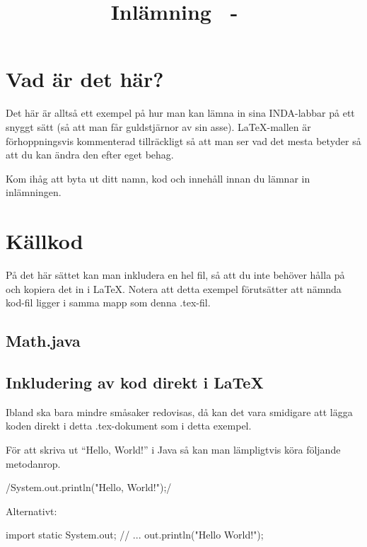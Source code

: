 \documentclass[a4paper,10pt,english,swedish]{article}
\title{Inlämning \assignmentnr\ - \course\ \coursename}
\date{\thedate}
\author{\theauthor}
\begin{document}


\setcounter{page}{1}

\section{Vad är det här?}

Det här är alltså ett exempel på hur man kan lämna in sina INDA-labbar
på ett snyggt sätt (så att man får guldstjärnor av sin
asse). \LaTeX-mallen är förhoppningsvis kommenterad tillräckligt så
att man ser vad det mesta betyder så att du kan ändra den efter eget
behag.

Kom ihåg att byta ut ditt namn, kod och innehåll innan du lämnar in
inlämningen.

\section{Källkod}

På det här sättet kan man inkludera en hel fil, så att du inte behöver
hålla på och kopiera det in i \LaTeX. Notera att detta exempel
förutsätter att nämnda kod-fil ligger i samma mapp som denna
.tex-fil.

\subsection{Math.java}

\subsection{Inkludering av kod direkt i \LaTeX}

Ibland ska bara mindre småsaker redovisas, då kan det vara smidigare
att lägga koden direkt i detta .tex-dokument som i detta exempel.

För att skriva ut ``Hello, World!'' i Java så kan man lämpligtvis köra
följande metodanrop.

\java/System.out.println("Hello, World!");/

Alternativt:

\begin{javacode}
  import static System.out;
  // ...
  out.println("Hello World!");
\end{javacode}
\end{document}
